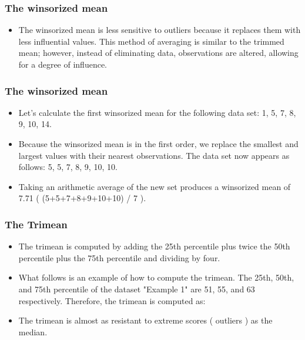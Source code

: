 \documentclass{beamer}
\begin{document}
\begin{frame}
\frametitle{The winsorized mean}
\Large
\begin{itemize}
\item The winsorized mean is less sensitive to outliers because it replaces them with less influential values. This method of averaging is similar to the trimmed mean; however, instead of eliminating data, observations are altered, allowing for a degree of influence.
\end{itemize}
\end{frame}
\begin{frame}
\frametitle{The winsorized mean}
\Large
\begin{itemize}
\item Let's calculate the first winsorized mean for the following data set: 1, 5, 7, 8, 9, 10, 14.
\item  Because the winsorized mean is in the first order, we replace the smallest and largest values with their nearest observations. The data set now appears as follows: 5, 5, 7, 8, 9, 10, 10. 
\item Taking an arithmetic average of the new set produces a winsorized mean of 7.71 ( (5+5+7+8+9+10+10) / 7 ).

\end{itemize}
\end{frame}
\begin{frame}
\frametitle{The Trimean}
\Large
\begin{itemize}

\item The trimean is computed by adding the 25th percentile plus twice the 50th percentile plus the 75th percentile and dividing by four. 
\item What follows is an example of how to compute the trimean. The 25th, 50th, and 75th percentile of the dataset "Example 1" are 51, 55, and 63 respectively. Therefore, the trimean is computed as:

\item The trimean is almost as resistant to extreme scores ( outliers ) as the median.
\end{itemize}
\end{frame}
\end{document}
